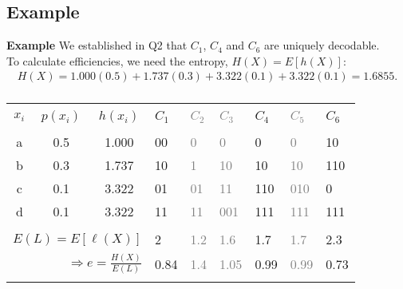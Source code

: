 \documentclass[compress]{beamer}        %
\makeatletter
\newcommand{\tcb}{\textcolor{beamer@blendedblue}}
\newcommand{\tcg}{\textcolor{gray}}
\makeatother
\begin{document}
\subsection{Example}
\begin{frame}{\bf \tcb{Example}}
We established in Q2 that $C_1$, $C_4$ and $C_6$ are uniquely decodable.\\[0.6cm]

To calculate efficiencies, we need the entropy, $H(X) = E[h(X)]$:\\[-0.4cm]
\begin{align*}
H(X) = 1.000(0.5)+1.737(0.3)+3.322(0.1)+3.322(0.1) = 1.6855.\\[-0.3cm]
\end{align*}
\begin{center}
\begin{tabular}{|ccc|l|l|l|l|l|l|}
\hline
&&&&&&&&\\[-0.4cm]
$x_i$ & $p(x_i)$ & $h(x_i)$ & $C_1$ & \tcg{$C_2$} & \tcg{$C_3$} & $C_4$ & \tcg{$C_5$} & $C_6$ \\[0.1cm]
\hline
&&&&&&&&\\[-0.4cm]
a & 0.5 & 1.000  &  00  &  \tcg{0}   &  \tcg{0}    &  0   &  \tcg{0}    &  10  \\[0.1cm]
b & 0.3 & 1.737  &  10  &  \tcg{1}   &  \tcg{10}   &  10  &  \tcg{10}   &  110 \\[0.1cm]
c & 0.1 & 3.322  &  01  &  \tcg{01}  &  \tcg{11}   &  110 &  \tcg{010}  &  0   \\[0.1cm]
d & 0.1 & 3.322  &  11  &  \tcg{11}  &  \tcg{001}  &  111 &  \tcg{111}  &  111 \\[0.1cm]
\hline
&&&&&&&&\\[-0.4cm]
\multicolumn{3}{|r|}{$E(L) = E[\ell(X)]$} & 2 & \tcg{1.2} & \tcg{1.6} & 1.7 & \tcg{1.7} & 2.3 \\[0.2cm]
\multicolumn{3}{|r|}{$\Rightarrow e = \frac{H(X)}{E(L)}$} & 0.84 & \tcg{1.4} & \tcg{1.05} & 0.99 & \tcg{0.99} & 0.73 \\[0.1cm]
\hline
\multicolumn{8}{c}{}\\[-0.3cm]
\end{tabular}
\end{center}

\end{frame}
\end{document}
